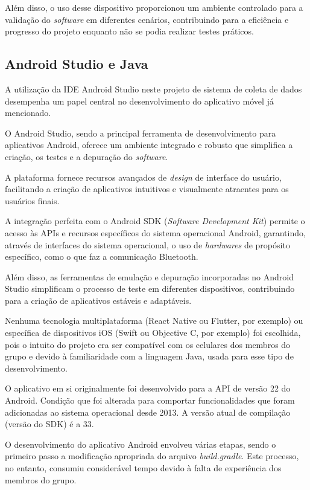     Além disso, o uso desse dispositivo proporcionou um ambiente controlado para a validação do \textit{software} em diferentes cenários, contribuindo para a eficiência e progresso do projeto enquanto não se podia realizar testes práticos.
    
    \subsection{Android Studio e Java} 
    A utilização da IDE Android Studio neste projeto de sistema de coleta de dados desempenha um papel central no desenvolvimento do aplicativo móvel já mencionado. 
    
    O Android Studio, sendo a principal ferramenta de desenvolvimento para aplicativos Android, oferece um ambiente integrado e robusto que simplifica a criação, os testes e a depuração do \textit{software}. 
    
    A plataforma fornece recursos avançados de \textit{design} de interface do usuário, facilitando a criação de aplicativos intuitivos e visualmente atraentes para os usuários finais. 
    
    A integração perfeita com o Android SDK (\textit{Software Development Kit}) permite o acesso às APIs e recursos específicos do sistema operacional Android, garantindo, através de interfaces do sistema operacional, o uso de \textit{hardwares} de propósito específico, como o que faz a comunicação Bluetooth. 
    
    Além disso, as ferramentas de emulação e depuração incorporadas no Android Studio simplificam o processo de teste em diferentes dispositivos, contribuindo para a criação de aplicativos estáveis e adaptáveis.

    Nenhuma tecnologia multiplataforma (React Native ou Flutter, por exemplo) ou específica de dispositivos iOS (Swift ou Objective C, por exemplo) foi escolhida, pois o intuito do projeto era ser compatível com os celulares dos membros do grupo e devido à familiaridade com a linguagem Java, usada para esse tipo de desenvolvimento.

    O aplicativo em si originalmente foi desenvolvido para a API de versão 22 do Android. Condição que foi alterada para comportar funcionalidades que foram adicionadas ao sistema operacional desde 2013. A versão atual de compilação (versão do SDK) é a 33.

    O desenvolvimento do aplicativo Android envolveu várias etapas, sendo o primeiro passo a modificação apropriada do arquivo \textit{build.gradle}. Este processo, no entanto, consumiu considerável tempo devido à falta de experiência dos membros do grupo. 
    
